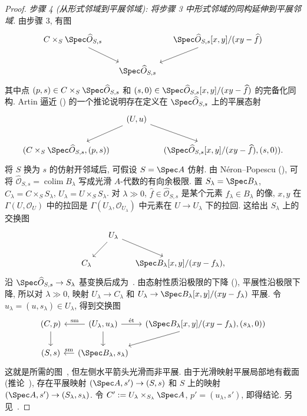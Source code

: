 \begin{proof}
\textit{步骤 4 (从形式邻域到平展邻域): 将步骤 3 中形式邻域的同构延伸到平展邻域.} 由步骤 3, 有图
\[
\begin{tikzcd}[column sep=small]
C\times_S\Spec\widehat{\mathcal O}_{S,s}\arrow[dr]&&\Spec\widehat{\mathcal O}_{S,s}[x,y]/(xy-\widehat f)\arrow[dl]\\
&\Spec\widehat{\mathcal O}_{S,s}&
\end{tikzcd}
\]
其中点 $(p,\allowbreak s)\in C\times_S\Spec\widehat{\mathcal O}_{S,\allowbreak s}$ 和 $(s,\allowbreak 0)\in\Spec\widehat{\mathcal O}_{S,\allowbreak s}[x,\allowbreak y]/(xy-\widehat f)$ 的完备化同构. Artin 逼近 () 的一个推论说明存在定义在 $\Spec\widehat{\mathcal O}_{S,\allowbreak s}$ 上的平展态射
\begin{equation}\label{src:6.2.30}
\begin{tikzcd}[column sep=small]
&(U,u)\arrow[dl]\arrow[dr]&\\
(C\times_S\Spec\widehat{\mathcal O}_{S,s},(p,s))&&(\Spec\widehat{\mathcal O}_{S,s}[x,y]/(xy-\widehat f),(s,0)).
\end{tikzcd}
\end{equation}
将 $S$ 换为 $s$ 的仿射开邻域后, 可假设 $S=\Spec A$ 仿射. 由 Néron--Popescu (), 可将 $\widehat{\mathcal O}_{S,\allowbreak s}=\operatorname{colim}B_\lambda$ 写成光滑 $A$-代数的有向余极限. 置 $S_\lambda=\Spec B_\lambda$, $C_\lambda=C\times_S S_\lambda$, $U_\lambda=U\times_S S_\lambda$. 对 $\lambda\gg0$, $\widehat f\in\widehat{\mathcal O}_{S,\allowbreak s}$ 是某个元素 $f_\lambda\in B_\lambda$ 的像, $x,\allowbreak y$ 在 $\Gamma(U,\allowbreak \mathcal O_U)$ 中的拉回是 $\Gamma(U_\lambda,\allowbreak \mathcal O_{U_\lambda})$ 中元素在 $U\to\allowbreak U_\lambda$ 下的拉回. 这给出 $S_\lambda$ 上的交换图
\[
\begin{tikzcd}[column sep=small]
&U_\lambda\arrow[dl]\arrow[dr]&\\
C_\lambda&&\Spec B_\lambda[x,y]/(xy-f_\lambda),
\end{tikzcd}
\]
沿 $\Spec\widehat{\mathcal O}_{S,\allowbreak s}\to\allowbreak S_\lambda$ 基变换后成为~. 由态射性质沿极限的下降 (), 平展性沿极限下降, 所以对 $\lambda\gg0$, 映射 $U_\lambda\to\allowbreak C_\lambda$ 和 $U_\lambda\to\Spec B_\lambda[x,\allowbreak y]/(xy-f_\lambda)$ 平展. 令 $u_\lambda=(u,\allowbreak s_\lambda)\in U_\lambda$, 得到交换图
\[
\begin{tikzcd}[column sep=small]
(C,p)\arrow[d]&(U_\lambda,u_\lambda)\arrow[l,"\mathrm{sm}"']\arrow[r,"\text{ét}"]\arrow[d]&(\Spec B_\lambda[x,y]/(xy-f_\lambda),(s_\lambda,0))\arrow[dl]\\
(S,s)&(\Spec B_\lambda,s_\lambda)\arrow[l,"\mathrm{sm}"']&
\end{tikzcd}
\]
这就是所需的图~, 但左侧水平箭头光滑而非平展. 由于光滑映射平展局部地有截面 (推论~), 存在平展映射 $(\Spec A,\allowbreak s')\to(S,\allowbreak s)$ 和 $S$ 上的映射 $(\Spec A,\allowbreak s')\to(S_\lambda,\allowbreak s_\lambda)$. 令 $C':=U_\lambda\times_{S_\lambda}\Spec A$, $p'=(u_\lambda,\allowbreak s')$, 即得结论. 另见~\cite[Tag 0CBY]{SP}.
\end{proof}
